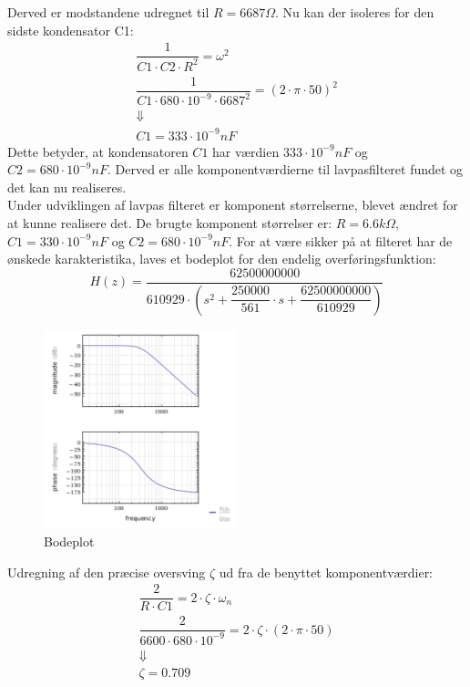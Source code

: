 Derved er modstandene udregnet til $ R = 6687\Omega $. Nu kan der isoleres for den sidste kondensator C1: 
\begin{equation}
\begin{split}
\dfrac{1}{C1\cdot C2\cdot R^2}= \omega^2\\
\dfrac{1}{C1\cdot 680\cdot 10^{-9}\cdot 6687^2}= (2\cdot \pi \cdot 50)^2\\
\Downarrow\\
C1=333\cdot 10^{-9} nF
\end{split}
\end{equation}
Dette betyder, at kondensatoren $ C1 $ har værdien $ 333\cdot 10^{-9} nF $  og  $ C2 = 680\cdot 10^{-9} nF$. Derved er alle komponentværdierne til lavpasfilteret fundet og det kan nu realiseres. \\ 
\newline
Under udviklingen af lavpas filteret er komponent størrelserne, blevet ændret for at kunne realisere det. De brugte komponent størrelser er: $ R= 6.6 k\Omega $, $ C1= 330\cdot 10 ^{-9} nF$ og $ C2= 680\cdot 10^{-9} nF$.   
For at være sikker på at filteret har de ønskede karakteristika, laves et bodeplot for den endelig overføringsfunktion: 
\begin{equation}
H(z)=\dfrac{62500000000}{610929\cdot \left( s^2+\dfrac{250000}{561}\cdot s + \dfrac{62500000000}{610929} \right)}
\end{equation}
\begin{figure}[H]
	\centering
	\includegraphics[width=0.5\textwidth]{Figurer/Bodeplot}
	\caption{Bodeplot}
	\label{fig:bodeplot}
\end{figure}
Udregning af den præcise oversving $ \zeta $ ud fra de benyttet komponentværdier: 
\begin{equation}
\begin{split}
\dfrac{2}{R\cdot C1}= 2\cdot \zeta\cdot \omega_n\\
\dfrac{2}{6600\cdot 680\cdot 10^{-9}}= 2\cdot \zeta\cdot (2\cdot \pi \cdot 50)\\
\Downarrow\\
\zeta = 0.709
\end{split}
\end{equation}

